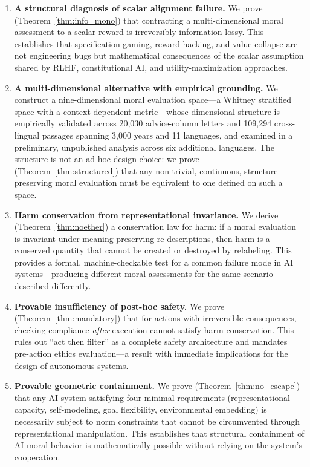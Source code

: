 \documentclass[12pt]{article}
\theoremstyle{definition}
\theoremstyle{remark}
\begin{document}
\begin{enumerate}
    \item \textbf{A structural diagnosis of scalar alignment failure.} We prove (Theorem~\ref{thm:info_mono}) that contracting a multi-dimensional moral assessment to a scalar reward is irreversibly information-lossy. This establishes that specification gaming, reward hacking, and value collapse are not engineering bugs but mathematical consequences of the scalar assumption shared by RLHF, constitutional AI, and utility-maximization approaches.

    \item \textbf{A multi-dimensional alternative with empirical grounding.} We construct a nine-dimensional moral evaluation space---a Whitney stratified space with a context-dependent metric---whose dimensional structure is empirically validated across 20,030 advice-column letters and 109,294 cross-lingual passages spanning 3,000 years and 11 languages, and examined in a preliminary, unpublished analysis across six additional languages. The structure is not an ad hoc design choice: we prove (Theorem~\ref{thm:structured}) that any non-trivial, continuous, structure-preserving moral evaluation must be equivalent to one defined on such a space.

    \item \textbf{Harm conservation from representational invariance.} We derive (Theorem~\ref{thm:noether}) a conservation law for harm: if a moral evaluation is invariant under meaning-preserving re-descriptions, then harm is a conserved quantity that cannot be created or destroyed by relabeling. This provides a formal, machine-checkable test for a common failure mode in AI systems---producing different moral assessments for the same scenario described differently.

    \item \textbf{Provable insufficiency of post-hoc safety.} We prove (Theorem~\ref{thm:mandatory}) that for actions with irreversible consequences, checking compliance \emph{after} execution cannot satisfy harm conservation. This rules out ``act then filter'' as a complete safety architecture and mandates pre-action ethics evaluation---a result with immediate implications for the design of autonomous systems.

    \item \textbf{Provable geometric containment.} We prove (Theorem~\ref{thm:no_escape}) that any AI system satisfying four minimal requirements (representational capacity, self-modeling, goal flexibility, environmental embedding) is necessarily subject to norm constraints that cannot be circumvented through representational manipulation. This establishes that structural containment of AI moral behavior is mathematically possible without relying on the system's cooperation.
\end{enumerate}
\end{document}

